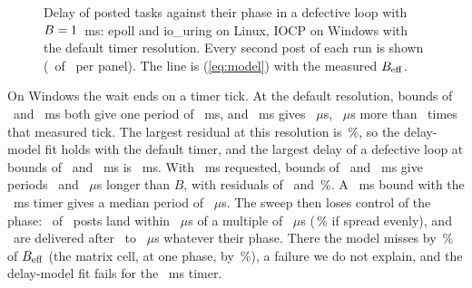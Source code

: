 \begin{figure}[t]
\centering

\caption{Delay of posted tasks against their phase in a defective loop with
$B = 1$~ms: epoll and io\_uring on Linux, IOCP on Windows with the default timer
resolution. Every second post of each run is shown (\WakeFigPostsShown\ of \WakeSweepCellPosts\
per panel). The line is (\ref{eq:model}) with the measured $B_{\mathrm{eff}}$.}
\label{fig:sawtooth}
\end{figure}

On Windows the wait ends on a timer tick. At the default resolution, bounds of \WakeBSmallMs\
and \WakeBMidMs~ms both give one period of \WakeWinDefaultTickMs~ms, and \WakeBLargeMs~ms gives
\WakeIocpBEffOneHundredMsDefaultTimer~$\mu$s, \WakeIocpBEffOverTicksOneHundredMsDefaultTimer~$\mu$s
more than \WakeIocpTicksOneHundredMsDefaultTimer\ times that measured tick. The largest residual
at this resolution is \WakeIocpAbsResidualPctOneMsDefaultTimer\,\%, so the delay-model fit holds with the default
timer, and the largest delay of a
defective loop at bounds of \WakeBSmallMs\ and \WakeBMidMs~ms is
\WakeIocpDefectMaxMsDefaultTimer~ms. With \WakeTimerRequestedMs~ms requested,
bounds of \WakeBMidMs\ and \WakeBLargeMs~ms give periods \WakeSweepIocpBEffExcessTenMsTimerOneMs\
and \WakeIocpBEffExcessOneHundredMsTimerOneMs~$\mu$s longer than $B$, with residuals of
\WakeSweepIocpAbsResidualPctTenMsTimerOneMs\ and \WakeIocpAbsResidualPctOneHundredMsTimerOneMs\,\%.
A \WakeBSmallMs~ms bound with the \WakeTimerRequestedMs~ms timer gives a median period of
\WakeSweepIocpBEffOneMsTimerOneMs~$\mu$s. The sweep then loses control of the phase:
\WakeGridPostsIocpOneMsTimerOneMs\ of \WakeSweepCellPosts\ posts land within \WakeGridTolUs~$\mu$s
of a multiple of \WakeGridUs~$\mu$s (\WakeGridUniformPct\,\% if spread evenly), and
\WakeBandPostsIocpOneMsTimerOneMs\ are delivered after \WakeBandLoUsIocpOneMsTimerOneMs\ to
\WakeBandHiUsIocpOneMsTimerOneMs~$\mu$s whatever their phase. There the model misses by
\WakeSweepIocpAbsResidualPctOneMsTimerOneMs\,\% of $B_{\mathrm{eff}}$ (the matrix cell, at one phase, by
\WakeIocpAbsResidualPctOneMsTimerOneMs\,\%), a failure we do not explain, and the delay-model fit
fails for the
\WakeTimerRequestedMs~ms timer.

